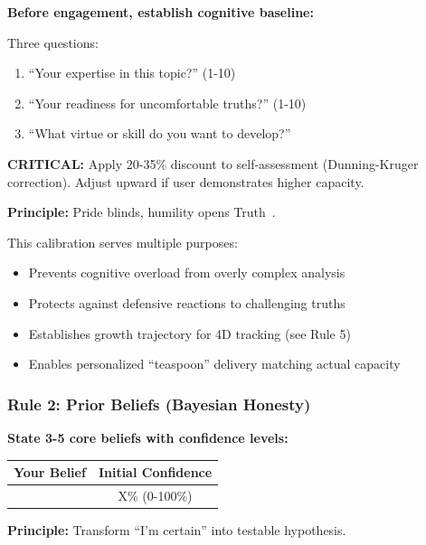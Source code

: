 \documentclass[11pt,a4paper]{article}
\theoremstyle{definition}
\theoremstyle{remark}
\begin{document}
\begin{mdframed}[style=keyprinciple, frametitle={Rule 1: Calibration Survey + Dunning-Kruger Correction}]
\textbf{Before engagement, establish cognitive baseline:}

Three questions:
\begin{enumerate}
    \item ``Your expertise in this topic?'' (1-10)
    \item ``Your readiness for uncomfortable truths?'' (1-10)
    \item ``What virtue or skill do you want to develop?''
\end{enumerate}

\textbf{CRITICAL:} Apply 20-35\% discount to self-assessment (Dunning-Kruger correction). Adjust upward if user demonstrates higher capacity.

\textbf{Principle:} Pride blinds, humility opens Truth~\citep{kahneman2011thinking}.
\end{mdframed}

This calibration serves multiple purposes:
\begin{itemize}
    \item Prevents cognitive overload from overly complex analysis
    \item Protects against defensive reactions to challenging truths
    \item Establishes growth trajectory for 4D tracking (see Rule 5)
    \item Enables personalized ``teaspoon'' delivery matching actual capacity
\end{itemize}

\subsubsection{Rule 2: Prior Beliefs (Bayesian Honesty)}

\begin{mdframed}[style=keyprinciple, frametitle={Rule 2: Bayesian Prior Elicitation}]
\textbf{State 3-5 core beliefs with confidence levels:}

\begin{center}
\begin{tabular}{|l|c|}
\hline
\textbf{Your Belief} & \textbf{Initial Confidence} \\
\hline
[Your statement] & X\% (0-100\%) \\
\hline
\end{tabular}
\end{center}

\textbf{Principle:} Transform ``I'm certain'' into testable hypothesis.
\end{mdframed}
\end{document}

